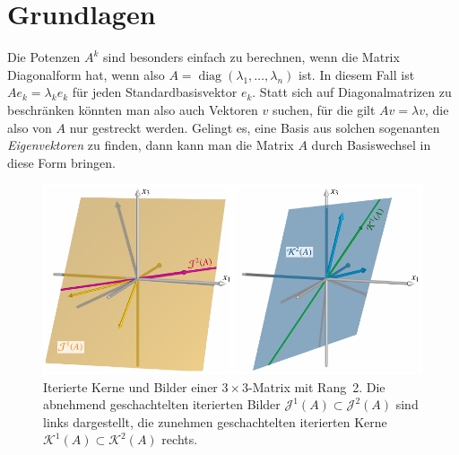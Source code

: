 %
%
%
\section{Grundlagen
\label{buch:section:grundlagen}}
Die Potenzen $A^k$ sind besonders einfach zu berechnen, wenn die Matrix
Diagonalform hat, wenn also $A=\operatorname{diag}(\lambda_1,\dots,\lambda_n)$
ist.
In diesem Fall ist $Ae_k=\lambda_k e_k$ für jeden Standardbasisvektor $e_k$.
Statt sich auf Diagonalmatrizen zu beschränken könnten man also auch
Vektoren $v$ suchen, für die gilt $Av=\lambda v$, die also von $A$ nur
gestreckt werden.
Gelingt es, eine Basis aus solchen sogenanten {\em Eigenvektoren} zu finden,
dann kann man die Matrix $A$ durch Basiswechsel in diese Form bringen.

\begin{figure}
\centering
\includegraphics[width=\textwidth]{chapters/40-eigenwerte/images/kernbild.pdf}
\caption{Iterierte Kerne und Bilder einer $3\times 3$-Matrix mit Rang~2.
Die abnehmend geschachtelten iterierten Bilder
$\mathcal{J}^1(A) \subset \mathcal{J}^2(A)$
sind links dargestellt, die zunehmen geschachtelten iterierten Kerne
$\mathcal{K}^1(A) \subset \mathcal{K}^2(A)$ rechts.
\label{buch:eigenwerte:img:kernbild}}
\end{figure}


